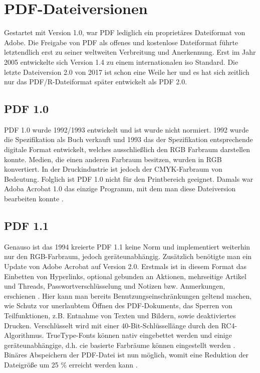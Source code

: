\section{PDF-Dateiversionen}
Gestartet mit Version 1.0, war PDF lediglich ein proprietäres Dateiformat von Adobe. Die Freigabe von PDF als offenes und kostenlose Dateiformat führte letztendlich erst zu seiner weltweiten Verbreitung und Anerkennung. Erst im Jahr 2005 entwickelte sich Version 1.4 zu einem internationalen \gls{iso} Standard. Die letzte Dateiversion 2.0 von 2017 ist schon eine Weile her und es hat sich zeitlich nur das PDF/R-Dateiformat später entwickelt als PDF 2.0.

\subsection{PDF 1.0}
PDF 1.0 wurde 1992/1993 entwickelt und ist wurde nicht normiert. 1992 wurde die Spezifikation als Buch verkauft und 1993 das der Spezifikation entsprechende digitale Format entwickelt, welches ausschließlich den RGB Farbraum darstellen konnte. Medien, die einen anderen Farbraum besitzen, wurden in RGB konvertiert. In der Druckindustrie ist jedoch der CMYK-Farbraum von Bedeutung. Folglich ist PDF 1.0 nicht für den Printbereich geeignet. Damals war Adoba Acrobat 1.0 das einzige Programm, mit dem man diese Dateiversion bearbeiten konnte \cite{proj-consult}. 

\subsection{PDF 1.1}
Genauso ist das 1994 kreierte PDF 1.1 keine Norm und implementiert weiterhin nur den RGB-Farbraum, jedoch geräteunabhängig. Zusätzlich benötigte man ein Update von Adobe Acrobat auf Version 2.0. Erstmals ist in diesem Format das Einbetten von Hyperlinks, optional gebunden an Aktionen, mehrseitige Artikel und Threads, Passwortverschlüsselung und Notizen bzw. Anmerkungen, erschienen \cite{proj-consult}. Hier kann man bereits Benutzungseinschränkungen geltend machen, wie Schutz vor unerlaubtem Öffnen des PDF-Dokuments, das Sperren von Teilfunktionen, z.B. Entnahme von Texten und Bildern, sowie deaktiviertes Drucken. Verschlüsselt wird mit einer 40-Bit-Schlüssellänge durch den RC4-Algorithmus. TrueType-Fonts können nativ eingebettet werden und einige geräteunabhängige, d.h. \gls{cie} basierte Farbräume können eingestellt werden \cite{schneeberger}. Binäres Abspeichern der PDF-Datei ist nun möglich, womit eine Reduktion der Dateigröße um 25 \% erreicht werden kann \cite{schneeberger}.


